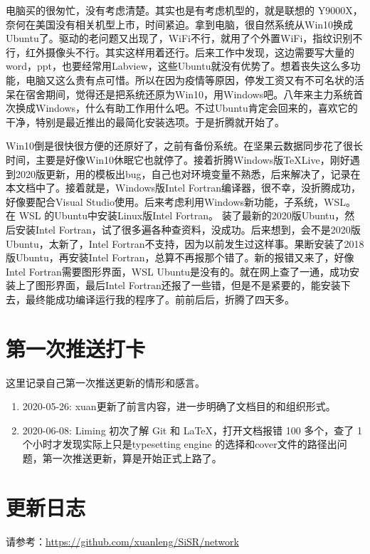 \documentclass[cn,11pt,chinese,twoside]{elegantbook}
\begin{document}
电脑买的很匆忙，没有考虑清楚。其实也是有考虑机型的，就是联想的 Y9000X，奈何在美国没有相关机型上市，时间紧迫。拿到电脑，很自然系统从Win10换成Ubuntu了。驱动的老问题又出现了，WiFi不行，就用了个外置WiFi，指纹识别不行，红外摄像头不行。其实这样用着还行。后来工作中发现，这边需要写大量的word，ppt，也要经常用Labview，这些Ubuntu就没有优势了。想着丧失这么多功能，电脑又这么贵有点可惜。所以在因为疫情等原因，停发工资又有不可名状的活呆在宿舍期间，觉得还是把系统还原为Win10，用Windows吧。八年来主力系统首次换成Windows，什么有助工作用什么吧。不过Ubuntu肯定会回来的，喜欢它的干净，特别是最近推出的最简化安装选项。于是折腾就开始了。

Win10倒是很快很方便的还原好了，之前有备份系统。在坚果云数据同步花了很长时间，主要是好像Win10休眠它也就停了。接着折腾Windows版\TeX Live，刚好遇到2020版更新，用的模板出bug，自己也对环境变量不熟悉，后来解决了，记录在本文档中了。接着就是，Windows版Intel Fortran编译器，很不幸，没折腾成功，好像要配合Visual Studio使用。后来考虑利用Windows新功能，子系统，WSL。在 WSL 的Ubuntu中安装Linux版Intel Fortran。 装了最新的2020版Ubuntu，然后安装Intel Fortran，试了很多遍各种查资料，没成功。后来想到，会不是2020版Ubuntu，太新了，Intel Fortran不支持，因为以前发生过这样事。果断安装了2018版Ubuntu，再安装Intel Fortran，总算不再报那个错了。新的报错又来了，好像Intel Fortran需要图形界面，WSL Ubuntu是没有的。就在网上查了一通，成功安装上了图形界面，最后Intel Fortran还报了一些错，但是不是紧要的，能安装下去，最终能成功编译运行我的程序了。前前后后，折腾了四天多。



\section*{第一次推送打卡}
这里记录自己第一次推送更新的情形和感言。
\begin{enumerate}
\item 2020-05-26: xuan更新了前言内容，进一步明确了文档目的和组织形式。
\item 2020-06-08: Liming 初次了解 Git 和 \LaTeX{}，打开文档报错 100 多个，查了 1 个小时才发现实际上只是typesetting engine 的选择和cover文件的路径出问题，第一次推送更新，算是开始正式上路了。
\end{enumerate}


\section*{更新日志}
请参考：\url{https://github.com/xuanleng/SiSR/network}
\end{document}
